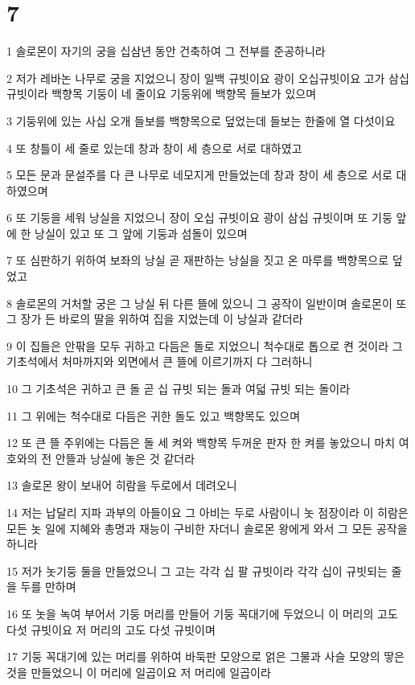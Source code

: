 \chapter{7}

\par 1 솔로몬이 자기의 궁을 십삼년 동안 건축하여 그 전부를 준공하니라
\par 2 저가 레바논 나무로 궁을 지었으니 장이 일백 규빗이요 광이 오십규빗이요 고가 삼십 규빗이라 백향목 기둥이 네 줄이요 기둥위에 백향목 들보가 있으며
\par 3 기둥위에 있는 사십 오개 들보를 백향목으로 덮었는데 들보는 한줄에 열 다섯이요
\par 4 또 창틀이 세 줄로 있는데 창과 창이 세 층으로 서로 대하였고
\par 5 모든 문과 문설주를 다 큰 나무로 네모지게 만들었는데 창과 창이 세 층으로 서로 대하였으며
\par 6 또 기둥을 세워 낭실을 지었으니 장이 오십 규빗이요 광이 삼십 규빗이며 또 기둥 앞에 한 낭실이 있고 또 그 앞에 기둥과 섬돌이 있으며
\par 7 또 심판하기 위하여 보좌의 낭실 곧 재판하는 낭실을 짓고 온 마루를 백향목으로 덮었고
\par 8 솔로몬의 거처할 궁은 그 낭실 뒤 다른 뜰에 있으니 그 공작이 일반이며 솔로몬이 또 그 장가 든 바로의 딸을 위하여 집을 지었는데 이 낭실과 같더라
\par 9 이 집들은 안팎을 모두 귀하고 다듬은 돌로 지었으니 척수대로 톱으로 켠 것이라 그 기초석에서 처마까지와 외면에서 큰 뜰에 이르기까지 다 그러하니
\par 10 그 기초석은 귀하고 큰 돌 곧 십 규빗 되는 돌과 여덟 규빗 되는 돌이라
\par 11 그 위에는 척수대로 다듬은 귀한 돌도 있고 백향목도 있으며
\par 12 또 큰 뜰 주위에는 다듬은 돌 세 켜와 백향목 두꺼운 판자 한 켜를 놓았으니 마치 여호와의 전 안뜰과 낭실에 놓은 것 같더라
\par 13 솔로몬 왕이 보내어 히람을 두로에서 데려오니
\par 14 저는 납달리 지파 과부의 아들이요 그 아비는 두로 사람이니 놋 점장이라 이 히람은 모든 놋 일에 지혜와 총명과 재능이 구비한 자더니 솔로몬 왕에게 와서 그 모든 공작을 하니라
\par 15 저가 놋기둥 둘을 만들었으니 그 고는 각각 십 팔 규빗이라 각각 십이 규빗되는 줄을 두를 만하며
\par 16 또 놋을 녹여 부어서 기둥 머리를 만들어 기둥 꼭대기에 두었으니 이 머리의 고도 다섯 규빗이요 저 머리의 고도 다섯 규빗이며
\par 17 기둥 꼭대기에 있는 머리를 위하여 바둑판 모양으로 얽은 그물과 사슬 모양의 땋은 것을 만들었으니 이 머리에 일곱이요 저 머리에 일곱이라
